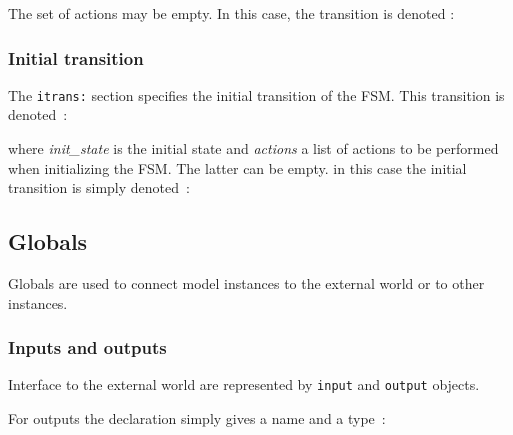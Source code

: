 \begin{center}
\end{center}


\medskip
The set of actions may be empty. In this case, the transition is denoted :

\begin{center}
\end{center}

\subsubsection*{Initial transition}
\label{sec:initial-transition}

The \verb|itrans:| section specifies the initial transition of the FSM. This transition is denoted~:

\begin{center}
\end{center}

where \emph{init\_state} is the initial state and \emph{actions} a list of actions to be performed
when initializing the FSM. The latter can be empty. in this case the initial transition is simply
denoted~:

\begin{center}
\end{center}

\subsection{Globals}
\label{sec:globals}

Globals are used to connect model instances to the external world or to other instances.

\subsubsection*{Inputs and outputs}
\label{sec:inputs-outputs}

Interface to the external world are represented by \verb|input| and \verb|output| objects.

\step For outputs the declaration simply gives a name and a type~:

\begin{center}
\end{center}


